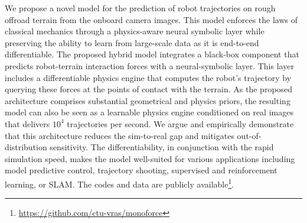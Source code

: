 We propose a novel model for the prediction of robot trajectories on rough offroad terrain from the onboard camera images.
This model enforces the laws of classical mechanics through a physics-aware neural symbolic layer while preserving the ability
to learn from large-scale data as it is end-to-end differentiable.
The proposed hybrid model integrates a black-box component that predicts robot-terrain interaction forces with a neural-symbolic layer.
This layer includes a differentiable physics engine that computes the robot’s trajectory by querying these forces at
the points of contact with the terrain.
As the proposed architecture comprises substantial geometrical and physics priors,
the resulting model can also be seen as a learnable physics engine conditioned on real images that
delivers $10^4$ trajectories per second.
We argue and empirically demonstrate that this architecture reduces the sim-to-real gap and mitigates out-of-distribution sensitivity.
The differentiability, in conjunction with the rapid simulation speed, makes the model well-suited for various applications
including model predictive control, trajectory shooting, supervised and reinforcement learning, or SLAM.
The codes and data are publicly available\footnote{\url{https://github.com/ctu-vras/monoforce}}.




